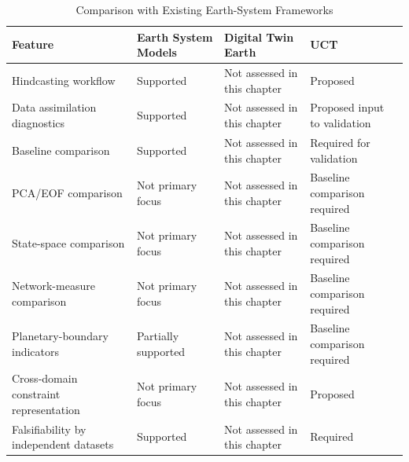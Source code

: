 \begin{table}
\centering
\caption{Comparison with Existing Earth-System Frameworks}
\label{tab:framework_comparison}
\begin{tabular}{p{}p{}p{}p{}}
\hline
Feature & Earth System Models & Digital Twin Earth & UCT \\
\hline
Hindcasting workflow & Supported & Not assessed in this chapter & Proposed \\
Data assimilation diagnostics & Supported & Not assessed in this chapter & Proposed input to validation \\
Baseline comparison & Supported & Not assessed in this chapter & Required for validation \\
PCA/EOF comparison & Not primary focus & Not assessed in this chapter & Baseline comparison required \\
State-space comparison & Not primary focus & Not assessed in this chapter & Baseline comparison required \\
Network-measure comparison & Not primary focus & Not assessed in this chapter & Baseline comparison required \\
Planetary-boundary indicators & Partially supported & Not assessed in this chapter & Baseline comparison required \\
Cross-domain constraint representation & Not primary focus & Not assessed in this chapter & Proposed \\
Falsifiability by independent datasets & Supported & Not assessed in this chapter & Required \\
\hline
\end{tabular}
\end{table}

